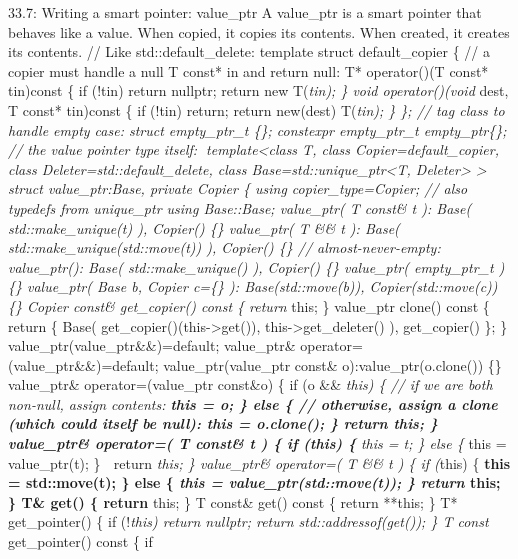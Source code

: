 33.7: Writing a smart pointer: value\_ptr A value\_ptr is a smart
pointer that behaves like a value. When copied, it copies its contents.
When created, it creates its contents. // Like std::default\_delete:
template struct default\_copier \{ // a copier must handle a null T
const* in and return null: T* operator()(T const* tin)const \{ if (!tin)
return nullptr; return new T(\emph{tin); \} void operator()(void} dest,
T const* tin)const \{ if (!tin) return; return new(dest) T(\emph{tin);
\} \}; // tag class to handle empty case: struct empty\_ptr\_t \{\};
constexpr empty\_ptr\_t empty\_ptr\{\}; // the value pointer type
itself: template\textless class T, class Copier=default\_copier, class
Deleter=std::default\_delete, class Base=std::unique\_ptr\textless T,
Deleter\textgreater{} \textgreater{} struct value\_ptr:Base, private
Copier \{ using copier\_type=Copier; // also typedefs from unique\_ptr
using Base::Base; value\_ptr( T const\& t ): Base( std::make\_unique(t)
), Copier() \{\} value\_ptr( T \&\& t ): Base(
std::make\_unique(std::move(t)) ), Copier() \{\} // almost-never-empty:
value\_ptr(): Base( std::make\_unique() ), Copier() \{\} value\_ptr(
empty\_ptr\_t ) \{\} value\_ptr( Base b, Copier c=\{\} ):
Base(std::move(b)), Copier(std::move(c)) \{\} Copier const\&
get\_copier() const \{ return }this; \} value\_ptr clone() const \{
return \{ Base( get\_copier()(this-\textgreater get()),
this-\textgreater get\_deleter() ), get\_copier() \}; \}
value\_ptr(value\_ptr\&\&)=default; value\_ptr\&
operator=(value\_ptr\&\&)=default; value\_ptr(value\_ptr const\&
o):value\_ptr(o.clone()) \{\} value\_ptr\& operator=(value\_ptr
const\&o) \{ if (o \&\& \emph{this) \{ // if we are both non-null,
assign contents: \textbf{this = \emph{o; \} else \{ // otherwise, assign
a clone (which could itself be null): }this = o.clone(); \} return
\emph{this; \} value\_ptr\& operator=( T const\& t ) \{ if (}this) \{
}this = t; \} else \{ }this = value\_ptr(t); \}  return \emph{this; \}
value\_ptr\& operator=( T \&\& t ) \{ if (}this) \{ \textbf{this =
std::move(t); \} else \{ \emph{this = value\_ptr(std::move(t)); \}
return }this; \} T\& get() \{ return }this; \} T const\& get() const \{
return **this; \} T* get\_pointer() \{ if (!\emph{this) return nullptr;
return std::addressof(get()); \} T const} get\_pointer() const \{ if
